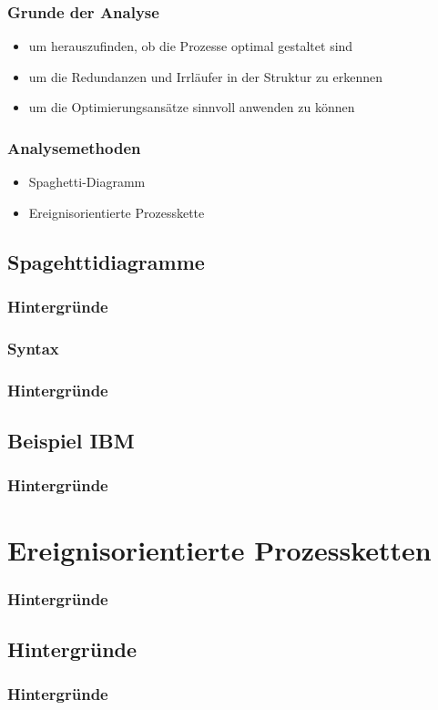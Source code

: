 \documentclass{beamer}
\begin{document}
  \begin{frame}
    \frametitle{Grunde der Analyse}
 	 \begin{itemize}
  		\item um herauszufinden, ob die Prozesse optimal gestaltet sind 
  		\item um die Redundanzen und Irrläufer in der Struktur zu erkennen 
  		\item um die Optimierungsansätze sinnvoll anwenden zu können
  	\end{itemize}
  \end{frame}

 
 \begin{frame}
  \frametitle{Analysemethoden}
  
  \begin{itemize}
 	 \item Spaghetti-Diagramm
  	\item Ereignisorientierte Prozesskette
  \end{itemize}
  
   
 \end{frame}

 \subsection[Spaghettidiagramme]{Spagehttidiagramme}
 \begin{frame}
  \frametitle{Hintergründe}

 \end{frame}

 \subsubsection[Syntax]{Syntax}
 \begin{frame}
  \frametitle{Hintergründe}

 \end{frame}

 \subsection[Beispiel IBM]{Beispiel IBM}
 \begin{frame}
  \frametitle{Hintergründe}

 \end{frame}

 \section[Ereignisorientierte Prozessketten]{Ereignisorientierte Prozessketten}
 \begin{frame}
  \frametitle{Hintergründe}

 \end{frame}

 \subsection[Hintergründe]{Hintergründe}
 \begin{frame}
  \frametitle{Hintergründe}

 \end{frame}
\end{document}
